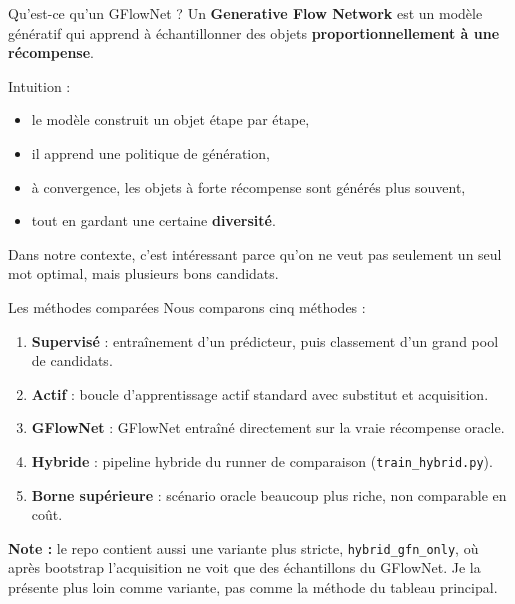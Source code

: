 \documentclass[aspectratio=169,10pt]{beamer}
\newcommand{\code}[1]{\texttt{#1}}
\begin{document}
\begin{frame}{Qu'est-ce qu'un GFlowNet ?}
\justifying
Un \textbf{Generative Flow Network} est un modèle génératif qui apprend à
échantillonner des objets \textbf{proportionnellement à une récompense}.

\vspace{0.5em}
Intuition :
\begin{itemize}
  \item le modèle construit un objet étape par étape,
  \item il apprend une politique de génération,
  \item à convergence, les objets à forte récompense sont générés plus souvent,
  \item tout en gardant une certaine \textbf{diversité}.
\end{itemize}

\vspace{0.5em}
Dans notre contexte, c'est intéressant parce qu'on ne veut pas seulement un
seul mot optimal, mais plusieurs bons candidats.
\end{frame}

\begin{frame}{Les méthodes comparées}
\justifying
Nous comparons cinq méthodes :

\begin{enumerate}
  \item \textbf{Supervisé} :
  entraînement d'un prédicteur, puis classement d'un grand pool de candidats.
  \item \textbf{Actif} :
  boucle d'apprentissage actif standard avec substitut et acquisition.
  \item \textbf{GFlowNet} :
  GFlowNet entraîné directement sur la vraie récompense oracle.
  \item \textbf{Hybride} :
  pipeline hybride du runner de comparaison (\code{train\_hybrid.py}).
  \item \textbf{Borne supérieure} :
  scénario oracle beaucoup plus riche, non comparable en coût.
\end{enumerate}

\vspace{0.5em}
\textbf{Note :} le repo contient aussi une variante plus stricte,
\code{hybrid\_gfn\_only}, où après bootstrap l'acquisition ne voit que des
échantillons du GFlowNet. Je la présente plus loin comme variante, pas comme
la méthode du tableau principal.
\end{frame}
\end{document}
